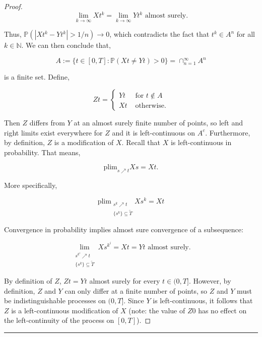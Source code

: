 \documentclass[12pt]{article}
\newcommand{\mb}{\mathbb}
\newcommand{\ra}{\rightarrow}
\newcommand{\te}{\text}
\newcommand{\lin}{\rule{\linewidth}{0.4 pt}}
\newcommand{\pr}{\mb{P}}							%
\newcommand{\T}{T}								%
\renewcommand{\t}{t}							%
\renewcommand{\tt}{s}							%
\newcommand{\X}{X}								%
\newcommand{\sln}[1]{^{#1}}						%
\newcommand{\alt}[1]{\widetilde{#1}}			%
\newcommand{\XX}{Y}								%
\newcommand{\XXX}{Z}							%
\renewcommand{\it}{k}							%
\newcommand{\Tset}{\alt{T}}						%
\newcommand{\typset}{A}							%
\begin{document}
\begin{proof}
\[\lim_{\it \ra\infty} \X{}{\t\sln{\it}} = \lim_{\it\ra\infty} \XX{}{\t\sln{\it}} \te{ almost surely.}\]

Thus, \(\pr(|\X{}{\t\sln{\it}} - \XX{}{\t\sln{\it}}| > 1/n) \ra 0\), which contradicts the fact that \(\t\sln{\it} \in \typset\sln{n}\) for all \(\it\in\mb{N}\). We can then conclude that,

\[\typset:= \{\t\in [0,\T]: \pr(\X{}{\t} \neq \XX{}{\t}) > 0\} = \cap_{n = 1}^\infty \typset\sln{n}\]

is a finite set. Define,

\[\XXX{}{\t}= \begin{cases}
\XX{}{\t} &\te{ for } \t \notin \typset\\
\X{}{\t} &\te{ otherwise.}
\end{cases}\]

Then \(\XXX{}{}\) differs from \(\XX{}{}\) at an almost surely finite number of points, so left and right limits exist everywhere for \(\XXX{}{}\) and it is left-continuous on \(\typset^c\). Furthermore, by definition, \(\XXX{}{}\) is a modification of \(\X{}{}\). Recall that \(\X{}{}\) is left-continuous in probability. That means,

\[\te{plim}_{\tt\nearrow \t} \X{}{\tt} = \X{}{\t}.\]

More specifically,

\[\te{plim}_{\substack{\tt\sln{\it}\nearrow \t\\\{\tt\sln{\it}\} \subseteq \Tset}} \X{}{\tt\sln{\it}} = \X{}{\t}\]

Convergence in probability implies almost sure convergence of a subsequence:

\[\lim_{\substack{\tt\sln{\it\sln{i}} \nearrow \t\\\{\tt\sln{\it}\}\subseteq \Tset}} \X{}{\tt\sln{\it\sln{i}}} = \X{}{\t} = \XX{}{\t} \te{ almost surely.}\]

By definition of \(\XXX{}{}\), \(\XXX{}{\t} = \XX{}{\t}\) almost surely for every \(t \in (0,\T]\). However, by definition, \(\XXX{}{}\) and \(\XX{}{}\) can only differ at a finite number of points, so \(\XXX{}{}\) and \(\XX{}{}\) must be indistinguishable processes on \((0,\T]\). Since \(\XX{}{}\) is left-continuous, it follows that \(\XXX{}{}\) is a left-continuous modification of \(\X{}{}\) (note: the value of \(\XXX{}{0}\) has no effect on the left-continuity of the process on \([0,\T]\)).
\end{proof}

\lin
\end{document}
